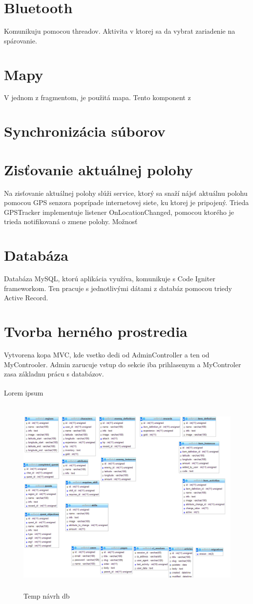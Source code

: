 \section{Bluetooth}
Komunikuju pomocou threadov. Aktivita v ktorej sa da vybrat zariadenie na spárovanie.

\section{Mapy}
V jednom z fragmentom, je použitá mapa. Tento komponent z 

\section{Synchronizácia súborov}

\section{Zisťovanie aktuálnej polohy}
Na zisťovanie aktuálnej polohy slúži service, ktorý sa snaží nájsť aktuálnu polohu pomocou GPS senzora poprípade internetovej siete, ku ktorej je pripojený. Trieda GPSTracker implementuje listener OnLocationChanged, pomocou ktorého je trieda notifikovaná o zmene polohy. Možnosť


\section{Databáza}
Databáza MySQL, ktorú aplikácia využíva, komunikuje s Code Igniter frameworkom. Ten pracuje s jednotlivými dátami z databáz pomocou triedy Active Record.


\section{Tvorba herného prostredia}
Vytvorena kopa MVC, kde vsetko dedi od AdminController a ten od MyControoler. Admin zarucuje vstup do sekcie iba prihlasenym a MyControler zasa základnu prácu s databázov.










\paragraph{}
Lorem ipsum 
\begin{figure}[h]
  \centering
  \includegraphics[height=10cm]{mainmatter/imgs/dbtemp.png}
  \caption{Temp návrh db}
  \label{fig:comenius}
\end{figure}
